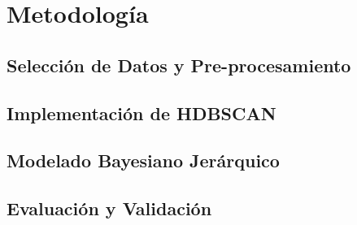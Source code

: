 \documentclass[../Main.tex]{subfiles}
\begin{document}
\section{Metodología}

\subsection{Selección de Datos y Pre-procesamiento}
\lipsum[1] %

\subsection{Implementación de HDBSCAN}
\lipsum[2] %

\subsection{Modelado Bayesiano Jerárquico}
\lipsum[3] %

\subsection{Evaluación y Validación}
\lipsum[4] %

\biblio 
\end{document}

